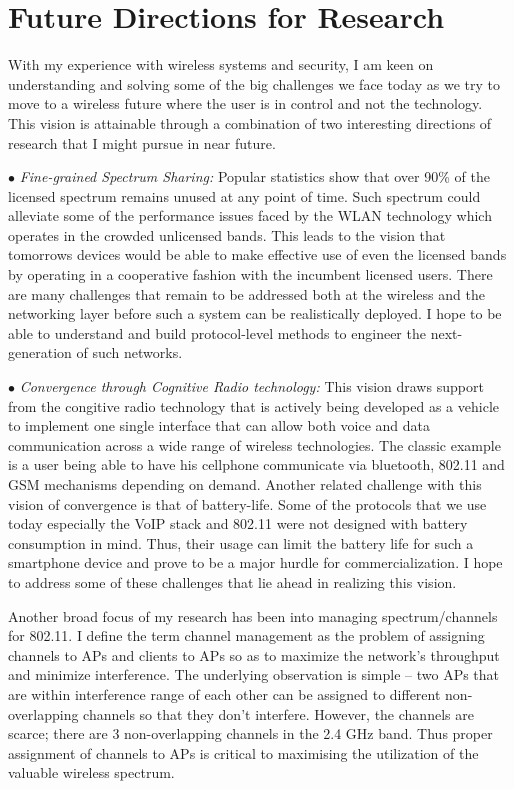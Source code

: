 \documentclass[11pt,letterpaper]{article}
\begin{document}
\section{Future Directions for Research} With my experience with wireless systems and security, I am keen on 
understanding and solving some of the big challenges we face today as we try to move to a  wireless future
where the user is in control and not the technology. This vision is attainable through a combination of two interesting 
directions of research that I might pursue in near future.

$\bullet$ {\it Fine-grained Spectrum Sharing:} Popular statistics show that over 90\% of the licensed spectrum remains
unused at any point of time.  Such spectrum could alleviate some of the performance issues faced by the WLAN technology
which operates in the crowded unlicensed bands. This leads to the vision that tomorrows devices would be able to make
effective use of even the licensed bands by operating in a cooperative fashion with the incumbent licensed users. There
are many challenges that remain to be addressed both at the wireless and the networking layer before such a system can
be realistically deployed. I hope to be able to understand and build protocol-level methods to engineer the
next-generation of such networks. 

$\bullet$ {\it Convergence through Cognitive Radio technology:} This vision draws support from the congitive radio
technology that is actively being developed as a vehicle to implement one single interface that can allow both voice and
data communication across a wide range of wireless technologies. The classic example is a user being able to have his
cellphone communicate via bluetooth, 802.11 and GSM mechanisms depending on demand. Another related challenge with this
vision of convergence is that of battery-life. Some of the protocols that we use today especially the VoIP stack and
802.11 were not designed with battery consumption in mind. Thus, their usage can limit the battery life for such a
smartphone device and prove to be a major hurdle for commercialization. I hope to address some of these challenges that lie
ahead in realizing this vision.

\iffalse
Another broad focus of my research  has been into managing spectrum/channels for 802.11. I define the term channel management
as the problem of assigning channels to APs and clients to APs so as to maximize the network's throughput and minimize
interference. The underlying observation is simple -- two APs that are within interference range of each other can be
assigned to different non-overlapping channels so that they don't interfere. However, the channels are scarce; there are
3 non-overlapping channels in the 2.4 GHz band. Thus proper assignment of channels to APs is critical to maximising the
utilization of the valuable wireless spectrum. 
\end{document}
